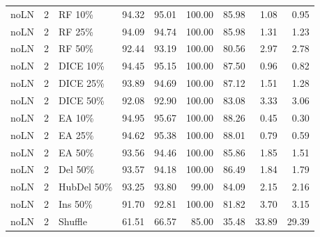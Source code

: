 {\begin{longtable}{rllrrrrrr}
noLN & 2 & RF 10\% & 94.32 & 95.01 & 100.00 & 85.98 & 1.08 & 0.95 \\
noLN & 2 & RF 25\% & 94.09 & 94.74 & 100.00 & 85.98 & 1.31 & 1.23 \\
noLN & 2 & RF 50\% & 92.44 & 93.19 & 100.00 & 80.56 & 2.97 & 2.78 \\
noLN & 2 & DICE 10\% & 94.45 & 95.15 & 100.00 & 87.50 & 0.96 & 0.82 \\
noLN & 2 & DICE 25\% & 93.89 & 94.69 & 100.00 & 87.12 & 1.51 & 1.28 \\
noLN & 2 & DICE 50\% & 92.08 & 92.90 & 100.00 & 83.08 & 3.33 & 3.06 \\
noLN & 2 & EA 10\% & 94.95 & 95.67 & 100.00 & 88.26 & 0.45 & 0.30 \\
noLN & 2 & EA 25\% & 94.62 & 95.38 & 100.00 & 88.01 & 0.79 & 0.59 \\
noLN & 2 & EA 50\% & 93.56 & 94.46 & 100.00 & 85.86 & 1.85 & 1.51 \\
noLN & 2 & Del 50\% & 93.57 & 94.18 & 100.00 & 86.49 & 1.84 & 1.79 \\
noLN & 2 & HubDel 50\% & 93.25 & 93.80 & 99.00 & 84.09 & 2.15 & 2.16 \\
noLN & 2 & Ins 50\% & 91.70 & 92.81 & 100.00 & 81.82 & 3.70 & 3.15 \\
noLN & 2 & Shuffle & 61.51 & 66.57 & 85.00 & 35.48 & 33.89 & 29.39 \\
\end{longtable}
}


